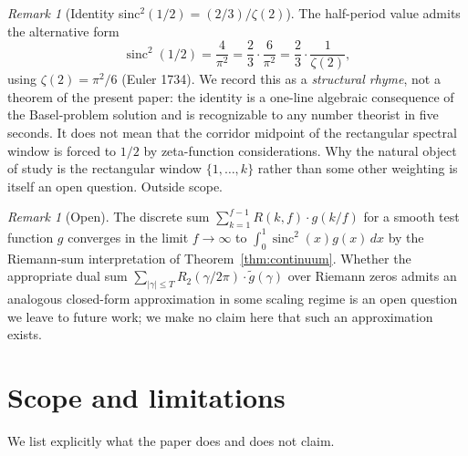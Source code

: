 \documentclass[11pt,reqno]{amsart}
\theoremstyle{plain}
\theoremstyle{definition}
\theoremstyle{remark}
\newtheorem{remark}[theorem]{Remark}
\DeclareMathOperator{\sinc}{sinc}
\begin{document}
\begin{remark}[Identity sinc$^2(1/2) = (2/3)/\zeta(2)$]
\label{rem:sinc-zeta}
The half-period value admits the alternative form
\[
  \sinc^2(1/2) = \frac{4}{\pi^2} = \frac{2}{3} \cdot \frac{6}{\pi^2}
  = \frac{2}{3} \cdot \frac{1}{\zeta(2)},
\]
using $\zeta(2) = \pi^2/6$ (Euler 1734). We record this as a
\emph{structural rhyme}, not a theorem of the present paper:
the identity is a one-line algebraic consequence of the
Basel-problem solution and is recognizable to any number theorist
in five seconds. It does not mean that the corridor midpoint of
the rectangular spectral window is forced to $1/2$ by
zeta-function considerations. Why the natural object of study is
the rectangular window $\{1, \ldots, k\}$ rather than some other
weighting is itself an open question. Outside scope.
\end{remark}

\begin{remark}[Open]\label{rem:open-bridge}
The discrete sum $\sum_{k = 1}^{f - 1} R(k, f) \cdot g(k / f)$ for
a smooth test function $g$ converges in the limit $f \to \infty$
to $\int_0^1 \sinc^2(x) g(x)\, dx$ by the Riemann-sum
interpretation of Theorem~\ref{thm:continuum}. Whether the
appropriate dual sum
$\sum_{|\gamma| \le T} R_2(\gamma / 2\pi) \cdot \tilde g(\gamma)$
over Riemann zeros admits an analogous closed-form approximation
in some scaling regime is an open question we leave to future
work; we make no claim here that such an approximation exists.
\end{remark}

\section{Scope and limitations}
\label{sec:scope}

We list explicitly what the paper does and does not claim.
\end{document}
